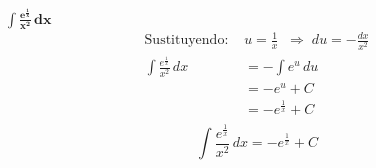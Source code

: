 $\displaystyle \mathbf{\int \frac{e^{\frac{1}{x}}}{x^{2}}\,dx}$ 
\nopagebreak
\begin{align*}
\text{Sustituyendo: } &u = \frac{1}{x}
\;\;\Rightarrow\; du = -\frac{dx}{x^{2}}\\[6pt]
\int \frac{e^{\frac{1}{x}}}{x^{2}}\,dx
&= -\int e^{u}\,du\\[6pt]
&= -e^{u}+C\\[6pt]
&= -e^{\frac{1}{x}} + C\\[4pt]
\end{align*}
\[
\boxed{\displaystyle 
\int \frac{e^{\frac{1}{x}}}{x^{2}}\,dx 
= -e^{\frac{1}{x}} + C}
\]
